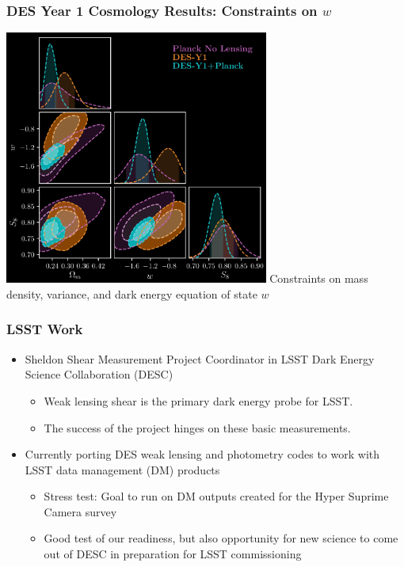 \documentclass{beamer}
\begin{document}
\frame
{
    \frametitle{DES Year 1 Cosmology Results: Constraints on $w$}


    \begin{center}
        \includegraphics[width=0.65\textwidth]{dpnl_w_inv.png}
        \newline
        Constraints on mass density, variance, and dark energy equation of state $w$
    \end{center}

}

\frame
{
    \frametitle{LSST Work}


    \begin{itemize}

         \item Sheldon {\color{gold} Shear Measurement Project Coordinator} in
             LSST Dark Energy Science Collaboration (DESC)

             \begin{itemize}
                 \item Weak lensing shear is the primary dark energy probe for LSST.
                 \item The success of the project hinges on these basic measurements.
             \end{itemize}

         \item Currently porting DES weak lensing and photometry codes to work
             with LSST data management (DM) products

         \begin{itemize}
             \item Stress test:  Goal to run on DM outputs created for the Hyper
                 Suprime Camera survey

             \item Good test of our readiness, but also opportunity for new science
                 to come out of DESC in preparation for LSST commissioning
         \end{itemize}

    \end{itemize}



}
\end{document}
